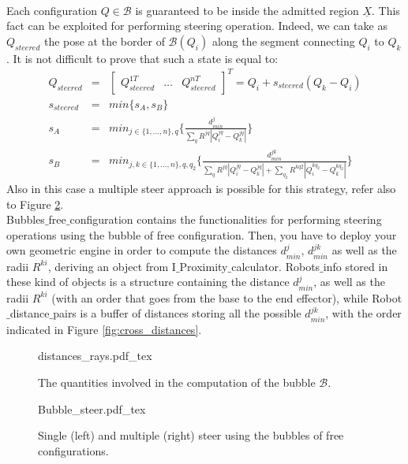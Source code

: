\\
Each configuration $Q \in \mathcal{B}$ is guaranteed to be inside the admitted region $\underline{X}$. This fact can be exploited for performing steering operation.
Indeed, we can take as $Q_{steered}$ the pose at the border of $\mathcal{B}(Q_i)$ along the segment connecting $Q_i$ to $Q_k$. It is not difficult to prove that such a state is equal to:
\begin{eqnarray}
Q_{steered} &=& \begin{bmatrix} Q_{steered}^{1T} & \hdots & Q_{steered}^{nT} \end{bmatrix}^T =  Q_i + s_{steered} (Q_k - Q_i) \nonumber\\
s_{steered} &=& min \bigg \lbrace s_A, s_B \bigg \rbrace  \nonumber\\
s_A &=& min_{j\in \lbrace 1,\hdots,n \rbrace, q} \bigg \lbrace 
\frac{d^j_{min}}{\sum _q R^{jq} | Q^{jq}_i - Q^{jq}_k |} 
\bigg \rbrace \nonumber\\
s_B &=& min_{j, k\in \lbrace 1,\hdots,n \rbrace, q,q_2} \bigg \lbrace 
\frac{d^{jk}_{min}}{\sum _q R^{jq} | Q^{jq}_i - Q^{jq}_k | + \sum _{q_2} R^{kq2} | Q^{kq_2}_i - Q^{kq_2}_k |}
\bigg \rbrace
\end{eqnarray}
Also in this case a multiple steer approach is possible for this strategy, refer also to Figure \ref{fig:bubbles}.
\\
Bubbles$\_$free$\_$configuration contains the functionalities for performing steering operations using the bubble of free configuration. Then, you have to deploy your own geometric engine in order to compute the distances $d^j_{min}$, $d^{jk}_{min}$ as well as the radii $R^{ki}$, deriving an object from I$\_$Proximity$\_$calculator.
Robots$\_$info stored in these kind of objects is a structure containing the distance $d^j_{min}$, as well as the radii $R^{ki}$ (with an order that goes from the base to the end effector), while Robot$\_$distance$\_$pairs is a buffer of distances storing all the possible $d^{jk}_{min}$, with the order indicated in Figure \ref{fig:cross_distances}.


 \begin{figure}
	 \centering
 \def\svgwidth{0.85 \columnwidth}
 {distances_rays.pdf_tex} 
	 \caption{The quantities involved in the computation of the bubble $\mathcal{B}$.}
 \label{fig:dist_ray}
 \end{figure}

 \begin{figure}
	 \centering
 \def\svgwidth{0.45 \columnwidth}
 {Bubble_steer.pdf_tex} 
	 \caption{Single (left) and multiple (right) steer using the bubbles of free configurations.}
 \label{fig:bubbles}
 \end{figure}


